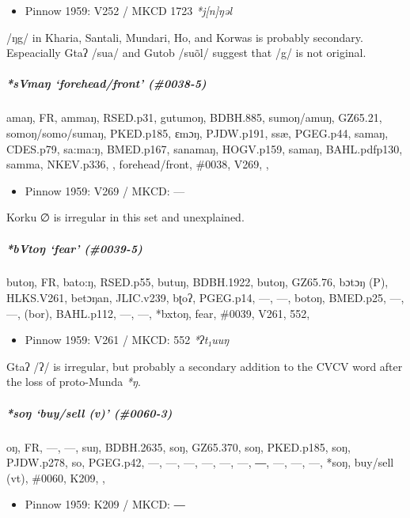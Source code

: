 \documentclass[a4paper,]{article}
\providecommand{\tightlist}{%
  \setlength{\itemsep}{0pt}\setlength{\parskip}{0pt}}
\let\oldsubparagraph\subparagraph
\renewcommand{\subparagraph}[1]{\oldsubparagraph{#1}\mbox{}}
\begin{document}
\begin{itemize}
\tightlist
\item
  Pinnow 1959: V252 / MKCD 1723 \emph{*j{[}n{]}ŋəl}
\end{itemize}

/ŋg/ in Kharia, Santali, Mundari, Ho, and Korwas is probably secondary.
Espeacially Gtaʔ /sua/ and Gutob /suõl/ suggest that /g/ is not
original.

\subparagraph{\texorpdfstring{\emph{*sVmaŋ} `forehead/front'
(\#0038-5)}{*sVmaŋ forehead/front (\#0038-5)}}\label{svmaux14b-foreheadfront-0038-5}

amaŋ, FR, ammaŋ, RSED.p31, gutumoŋ, BDBH.885, sumoŋ/amuŋ, GZ65.21,
somoŋ/somo/sumaŋ, PKED.p185, ɛmɔŋ, PJDW.p191, ssæ, PGEG.p44, samaŋ,
CDES.p79, sa:ma:ŋ, BMED.p167, sanamaŋ, HOGV.p159, samaŋ, BAHL.pdfp130,
samma, NKEV.p336, , forehead/front, \#0038, V269, ,

\begin{itemize}
\tightlist
\item
  Pinnow 1959: V269 / MKCD: ---
\end{itemize}

Korku ∅ is irregular in this set and unexplained.

\subparagraph{\texorpdfstring{\emph{*bVtoŋ} `fear'
(\#0039-5)}{*bVtoŋ fear (\#0039-5)}}\label{bvtoux14b-fear-0039-5}

butoŋ, FR, bato:ŋ, RSED.p55, butuŋ, BDBH.1922, butoŋ, GZ65.76, bɔtɔŋ
(P), HLKS.V261, betɔŋan, JLIC.v239, bʈoʔ, PGEG.p14, ---, ---, botoŋ,
BMED.p25, ---, ---, (bor), BAHL.p112, ---, ---, *bxtoŋ, fear, \#0039,
V261, 552,

\begin{itemize}
\tightlist
\item
  Pinnow 1959: V261 / MKCD: 552 \emph{*ʔt₁uuŋ}
\end{itemize}

Gtaʔ /ʔ/ is irregular, but probably a secondary addition to the CVCV
word after the loss of proto-Munda \emph{*ŋ}.

\subparagraph{\texorpdfstring{\emph{*soŋ} `buy/sell (v)'
(\#0060-3)}{*soŋ buy/sell (v) (\#0060-3)}}\label{soux14b-buysell-v-0060-3}

oŋ, FR, ---, ---, suŋ, BDBH.2635, soŋ, GZ65.370, soŋ, PKED.p185, soŋ,
PJDW.p278, so, PGEG.p42, ---, ---, ---, ---, ---, ---, ―, ---, ---, ---,
*soŋ, buy/sell (vt), \#0060, K209, ,

\begin{itemize}
\tightlist
\item
  Pinnow 1959: K209 / MKCD: ―
\end{itemize}
\end{document}
